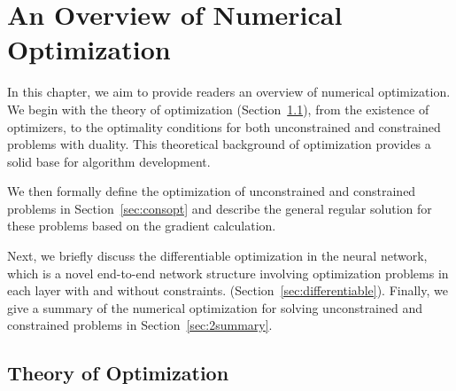 \chapter{An Overview of Numerical Optimization}
\label{cha:overviewpart1}
In this chapter, we aim to provide readers an overview of numerical optimization. We begin with the theory of optimization (Section~\ref{sec:theory}), from the existence of optimizers, to the optimality conditions for both unconstrained and constrained problems with duality. This theoretical background of optimization provides a solid base for algorithm development. 
\par We then formally define the optimization of unconstrained and constrained problems in Section~\ref{sec:consopt} and describe the general regular solution for these problems based on the gradient calculation. 
\par Next, we briefly discuss the differentiable optimization in the neural network, which is a novel end-to-end network structure involving optimization problems in each layer with and without constraints. (Section~\ref{sec:differentiable}). Finally, we give a summary of the numerical optimization for solving unconstrained and constrained problems in Section~\ref{sec:2summary}.




\section{Theory of Optimization}
\label{sec:theory}
